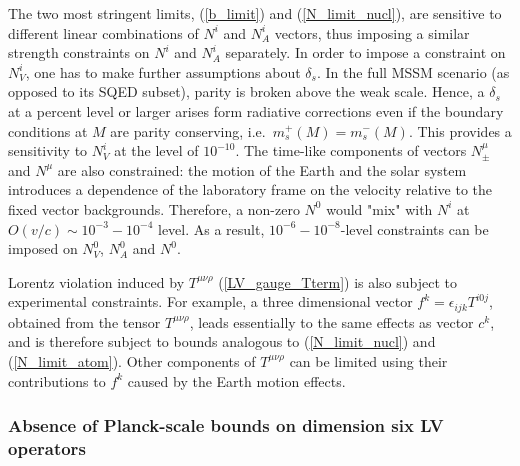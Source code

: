 \documentclass[12pt]{revtex4}
\begin{document}
The two most stringent limits, (\ref{b_limit}) and (\ref{N_limit_nucl}),
are sensitive to different linear combinations of $N^i$ and $N_A^i$ vectors,
thus imposing a similar strength constraints on $N^i$ and $N_A^i$
separately. In order to impose a constraint on $N_V^i$, one has to  
make further assumptions about $\delta_s$. In the full MSSM scenario
(as opposed to its SQED subset), parity is broken above the weak
scale. 
Hence,  a $\delta_s $ at a percent level or larger
arises form radiative corrections even if the boundary conditions at
$M$ are parity conserving, i.e.\ $m_s^+(M) = m_s^-(M)$. 
This provides a sensitivity to $N_V^i$ at the level of $10^{-10}$. 
The time-like components of vectors $N_\pm^\mu$ and $N^\mu $ are 
also constrained:  
the motion of the Earth and the solar system introduces a dependence
of the laboratory frame  on the velocity relative to the fixed vector
backgrounds. Therefore, a non-zero $N^0$ would "mix" with 
$N^i$ at $O(v/c) \sim 10^{-3}-10^{-4}$ level. As a result, 
$10^{-6}-10^{-8}$-level constraints can be 
imposed on $N_V^0$, $N_A^0$ and $N^0$. 


Lorentz violation induced by $ T^{\mu\nu\rho} $ (\ref{LV_gauge_Tterm})
is also subject to experimental constraints. For example, 
a three dimensional vector $ f^k=\epsilon_{ijk} T^{i0j}$, 
obtained from the tensor $T^{\mu\nu\rho} $, leads essentially to the
same effects as  vector $c^k$, and is therefore subject to bounds
analogous to (\ref{N_limit_nucl}) and (\ref{N_limit_atom}). Other
components of $ T^{\mu\nu\rho} $ can be limited using   
their contributions to $f^k$ caused by the Earth motion effects. 


\subsubsection*{Absence of Planck-scale bounds on dimension six LV operators}
\end{document}
